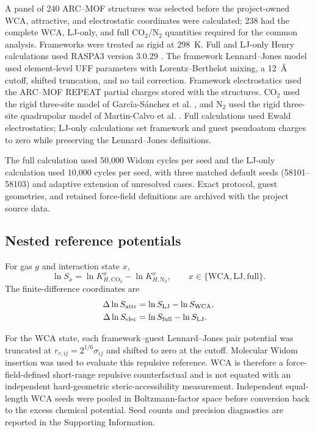 \documentclass[11pt,a4paper]{article}
\begin{document}
A panel of 240 ARC--MOF structures \cite{burner2023arcmof} was selected before the project-owned WCA, attractive, and electrostatic coordinates were calculated; 238 had the complete WCA, LJ-only, and full CO$_2$/N$_2$ quantities required for the common analysis. Frameworks were treated as rigid at 298~K. Full and LJ-only Henry calculations used RASPA3 version 3.0.29 \cite{ran2024raspa3,dubbeldam2016raspa}. The framework Lennard--Jones model used element-level UFF parameters \cite{rappe1992uff} with Lorentz--Berthelot mixing, a 12~\AA{} cutoff, shifted truncation, and no tail correction. Framework electrostatics used the ARC--MOF REPEAT partial charges stored with the structures. CO$_2$ used the rigid three-site model of Garc\'ia-S\'anchez et al. \cite{garciasanchez2009co2}, and N$_2$ used the rigid three-site quadrupolar model of Martin-Calvo et al. \cite{martincalvo2015gases}. Full calculations used Ewald electrostatics; LJ-only calculations set framework and guest pseudoatom charges to zero while preserving the Lennard--Jones definitions.

The full calculation used 50,000 Widom cycles per seed and the LJ-only calculation used 10,000 cycles per seed, with three matched default seeds (58101--58103) and adaptive extension of unresolved cases. Exact protocol, guest geometries, and retained force-field definitions are archived with the project source data.

\subsection{Nested reference potentials}

For gas $g$ and interaction state $x$,
\begin{equation}
\ln S_x
=
\ln K_{H,\mathrm{CO_2}}^x
-
\ln K_{H,\mathrm{N_2}}^x,
\qquad
x\in\{\mathrm{WCA},\mathrm{LJ},\mathrm{full}\}.
\end{equation}
The finite-difference coordinates are
\begin{align}
\Delta\ln S_{\rm attr} &= \ln S_{\rm LJ}-\ln S_{\rm WCA},\\
\Delta\ln S_{\rm elec} &= \ln S_{\rm full}-\ln S_{\rm LJ}.
\end{align}

For the WCA state, each framework--guest Lennard--Jones pair potential was truncated at
$r_{c,ij}=2^{1/6}\sigma_{ij}$ and shifted to zero at the cutoff. Molecular Widom insertion \cite{widom1963} was used to evaluate this repulsive reference. WCA is therefore a force-field-defined short-range repulsive counterfactual and is not equated with an independent hard-geometric steric-accessibility measurement. Independent equal-length WCA seeds were pooled in Boltzmann-factor space before conversion back to the excess chemical potential. Seed counts and precision diagnostics are reported in the Supporting Information.
\end{document}
